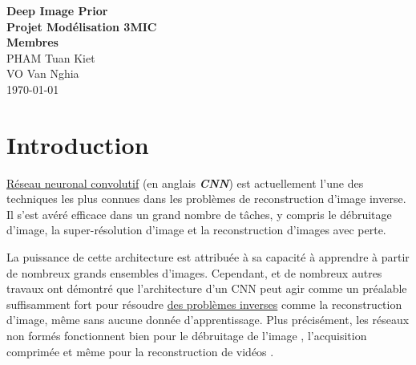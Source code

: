\documentclass[
  11pt,
  dvipsnames]{article}
\author{}
\date{\vspace{-2.5em}}
\begin{document}
\onehalfspacing


\begin{titlepage}
\vspace*{\fill}
\begin{center}
\LARGE{\textbf{Deep Image Prior}}\\
\Large{\textbf{Projet Modélisation 3MIC}}\\
\vspace*{1\baselineskip}
\Large{\textbf{Membres}}\\
PHAM Tuan Kiet\\
VO Van Nghia\\
\vfill %
\vspace*{\fill}
\today
\end{center}
\end{titlepage}

\newpage

\newpage
{}
\tableofcontents
{}

\listoffigures

\newpage
{}

\hypertarget{introduction}{%
\section{Introduction}\label{introduction}}

\protect\hyperlink{ruxe9seau-neuronal-convolutif}{Réseau neuronal convolutif} (en anglais \textbf{\emph{CNN}}) est actuellement l'une des techniques les plus connues dans les problèmes de reconstruction d'image inverse. Il s'est avéré efficace dans un grand nombre de tâches, y compris le débruitage d'image, la super-résolution d'image et la reconstruction d'images avec perte.

La puissance de cette architecture est attribuée à sa capacité à apprendre à partir de nombreux grands ensembles d'images. Cependant, \autocite{2007.02471,1711.10925} et de nombreux autres travaux ont démontré que l'architecture d'un CNN peut agir comme un préalable suffisamment fort pour résoudre \protect\hyperlink{les-probluxe8mes-inverses}{des problèmes inverses} comme la reconstruction d'image, même sans aucune donnée d'apprentissage. Plus précisément, les réseaux non formés fonctionnent bien pour le débruitage de l'image \autocite{2007.02471}, l'acquisition comprimée \autocite{1806.06438} et même pour la reconstruction de vidéos \autocite{1910.01684}.
\end{document}
